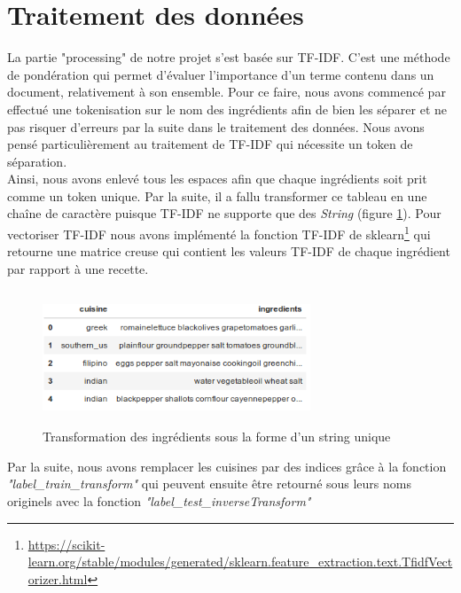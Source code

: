 \documentclass[12pt]{article}
\begin{document}
\section{Traitement des données}
La partie "processing" de notre projet s'est basée sur TF-IDF. C'est une méthode de pondération qui permet d'évaluer l'importance d'un terme contenu dans un document, relativement à son ensemble. Pour ce faire, nous avons commencé par effectué une tokenisation sur le nom des ingrédients afin de bien les séparer et ne pas risquer d'erreurs par la suite dans le traitement des données. Nous avons pensé particulièrement au traitement de TF-IDF qui nécessite un token de séparation. \\ Ainsi, nous avons enlevé tous les espaces afin que chaque ingrédients soit prit comme un token unique. Par la suite, il a fallu transformer ce tableau en une chaîne de caractère puisque TF-IDF ne supporte que des \textit{String} (figure \ref{label-image4}). Pour vectoriser TF-IDF nous avons implémenté la fonction TF-IDF de sklearn\footnote{\url{https://scikit-learn.org/stable/modules/generated/sklearn.feature_extraction.text.TfidfVectorizer.html}} qui retourne une matrice creuse qui contient les valeurs TF-IDF de chaque ingrédient par rapport à une recette.

\begin{figure}[h]
	\begin{center}
	\includegraphics[width=8cm,height=4cm]{./tableau_string.png}
	\end{center}
	\caption{Transformation des ingrédients sous la forme d'un string unique}
	\label{label-image4}
\end{figure}

Par la suite, nous avons remplacer les cuisines par des indices grâce à la fonction \textit{"label\_train\_transform"} qui peuvent ensuite être retourné sous leurs noms originels avec la fonction \textit{"label\_test\_inverseTransform"}
\end{document}
